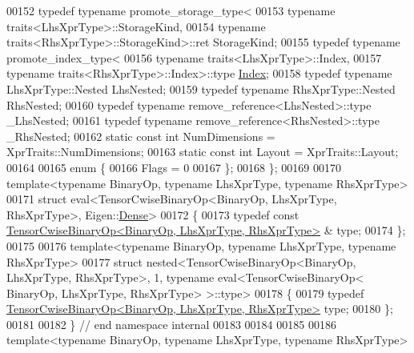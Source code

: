 \begin{DoxyCode}
00152   \textcolor{keyword}{typedef} \textcolor{keyword}{typename} promote\_storage\_type<
00153       \textcolor{keyword}{typename} traits<LhsXprType>::StorageKind,
00154       \textcolor{keyword}{typename} traits<RhsXprType>::StorageKind>::ret StorageKind;
00155   \textcolor{keyword}{typedef} \textcolor{keyword}{typename} promote\_index\_type<
00156       \textcolor{keyword}{typename} traits<LhsXprType>::Index,
00157       \textcolor{keyword}{typename} traits<RhsXprType>::Index>::type \hyperlink{namespace_eigen_a62e77e0933482dafde8fe197d9a2cfde}{Index};
00158   \textcolor{keyword}{typedef} \textcolor{keyword}{typename} LhsXprType::Nested LhsNested;
00159   \textcolor{keyword}{typedef} \textcolor{keyword}{typename} RhsXprType::Nested RhsNested;
00160   \textcolor{keyword}{typedef} \textcolor{keyword}{typename} remove\_reference<LhsNested>::type \_LhsNested;
00161   \textcolor{keyword}{typedef} \textcolor{keyword}{typename} remove\_reference<RhsNested>::type \_RhsNested;
00162   \textcolor{keyword}{static} \textcolor{keyword}{const} \textcolor{keywordtype}{int} NumDimensions = XprTraits::NumDimensions;
00163   \textcolor{keyword}{static} \textcolor{keyword}{const} \textcolor{keywordtype}{int} Layout = XprTraits::Layout;
00164 
00165   \textcolor{keyword}{enum} \{
00166     Flags = 0
00167   \};
00168 \};
00169 
00170 \textcolor{keyword}{template}<\textcolor{keyword}{typename} BinaryOp, \textcolor{keyword}{typename} LhsXprType, \textcolor{keyword}{typename} RhsXprType>
00171 \textcolor{keyword}{struct }eval<TensorCwiseBinaryOp<BinaryOp, LhsXprType, RhsXprType>, Eigen::\hyperlink{struct_eigen_1_1_dense}{Dense}>
00172 \{
00173   \textcolor{keyword}{typedef} \textcolor{keyword}{const} \hyperlink{class_eigen_1_1_tensor_cwise_binary_op}{TensorCwiseBinaryOp<BinaryOp, LhsXprType, RhsXprType>}
      & type;
00174 \};
00175 
00176 \textcolor{keyword}{template}<\textcolor{keyword}{typename} BinaryOp, \textcolor{keyword}{typename} LhsXprType, \textcolor{keyword}{typename} RhsXprType>
00177 \textcolor{keyword}{struct }nested<TensorCwiseBinaryOp<BinaryOp, LhsXprType, RhsXprType>, 1, typename eval<TensorCwiseBinaryOp<
      BinaryOp, LhsXprType, RhsXprType> >::type>
00178 \{
00179   \textcolor{keyword}{typedef} \hyperlink{class_eigen_1_1_tensor_cwise_binary_op}{TensorCwiseBinaryOp<BinaryOp, LhsXprType, RhsXprType>}
       type;
00180 \};
00181 
00182 \}  \textcolor{comment}{// end namespace internal}
00183 
00184 
00185 
00186 \textcolor{keyword}{template}<\textcolor{keyword}{typename} BinaryOp, \textcolor{keyword}{typename} LhsXprType, \textcolor{keyword}{typename} RhsXprType>

\end{DoxyCode}
